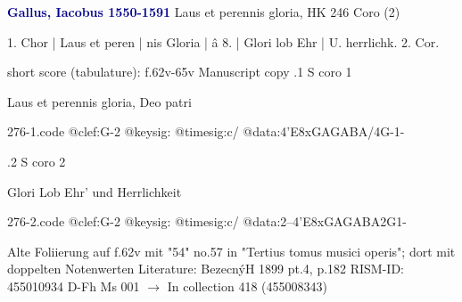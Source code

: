\documentclass[twocolumn]{book}
\begin{document}
\newline \par \vspace{7pt} \textcolor{darkblue}{\textbf{Gallus, Iacobus  1550-1591}}
\newline Laus et perennis gloria, HK 246
\newline Coro (2)
\newline \begin{itshape}[f.62v, at left:] 1. Chor | Laus et peren | nis Gloria | â 8. | Glori lob Ehr | U. herrlichk. 2. Cor.\end{itshape} 
\newline \textcolor{darkblue}{}  short score (tabulature): f.62v-65v
\newline Manuscript copy
.1  S coro 1
\newline \begin{footnotesize} Laus et perennis gloria, Deo patri \end{footnotesize}  
\begin{filecontents*}{276-1.code}
@clef:G-2
@keysig:
@timesig:c/
@data:4'E{8xGA}{GABA}/4G-1-
\end{filecontents*}
\newline
%

.2  S coro 2
\newline \begin{footnotesize} Glori Lob Ehr' und Herrlichkeit \end{footnotesize}  
\begin{filecontents*}{276-2.code}
@clef:G-2
@keysig:
@timesig:c/
@data:2--4'E{8xGAGA}{BA}2G1-
\end{filecontents*}
\newline
%

\newline Alte Foliierung auf f.62v mit "54"
\newline no.57 in "Tertius tomus musici operis"; dort mit doppelten Notenwerten
\newline Literature: BezecnýH 1899  pt.4, p.182
\newline RISM-ID: 455010934
\newline D-Fh  Ms 001
\newline $\rightarrow$ In collection 418 (455008343)
      
\end{document}
